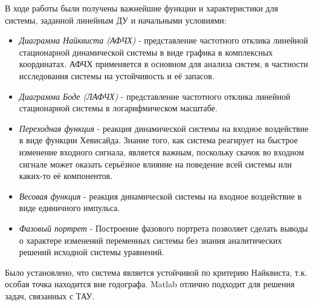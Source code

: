 \documentclass[14pt,a4paper,report]{report}
\begin{document}
В ходе работы были получены важнейшие функции и характеристики для системы, заданной линейным ДУ и начальными условиями:

\begin{itemize}
	\item \emph{Диаграмма Найквиста (АФЧХ)} - представление частотного отклика линейной стационарной динамической системы в виде графика в комплексных координатах. АФЧХ применяется в основном для анализа систем, в частности исследования системы на устойчивость и её запасов.
	\item \emph{Диаграмма Боде (ЛАФЧХ)} - представление частотного отклика линейной стационарной системы в логарифмическом масштабе.
	\item \emph{Переходная функция} - реакция динамической системы на входное воздействие в виде функции Хевисайда. Знание того, как система реагирует на быстрое изменение входного сигнала, является важным, поскольку скачок во входном сигнале может оказать серьёзное влияние на поведение всей системы или каких-то её компонентов.
	\item \emph{Весовая функция} - реакция динамической системы на входное воздействие в виде единичного импульса. 
	\item \emph{Фазовый портрет} - Построение фазового портрета позволяет сделать выводы о характере изменений переменных системы без знания аналитических решений исходной системы уравнений.
\end{itemize}
Было установлено, что система является устойчивой по критерию Найквиста, т.к. особая точка находится вне годографа. 
Matlab отлично подходит для решения задач, связанных с ТАУ.
\end{document}
